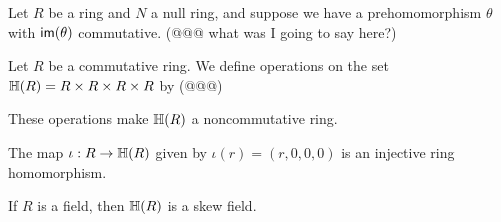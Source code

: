 \begin{exercise}
Let \(R\) be a ring and \(N\) a null ring, and suppose we have a prehomomorphism \(\theta\) with \( \mathsf{im}(\theta) \) commutative.
(@@@ what was I going to say here?)
\end{exercise}


\begin{exercise}
Let \(R\) be a commutative ring.
We define operations on the set \(\mathbb{H}(R) = R \times R \times R \times R\) by (@@@)
\begin{proplist}
\item These operations make \(\mathbb{H}(R)\) a noncommutative ring.
\item The map \(\iota : R \rightarrow \mathbb{H}(R)\) given by \(\iota(r) = (r,0,0,0)\) is an injective ring homomorphism.
\item If \(R\) is a field, then \(\mathbb{H}(R)\) is a skew field.
\end{proplist}
\end{exercise}
